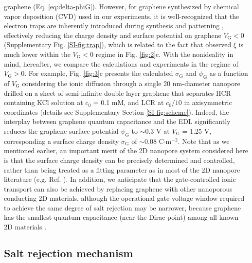\documentclass[journal=nalefd,email=true, hyperref=true, keywords=false]{achemso}
\newcommand{\Fig}{Fig.}
\begin{document}
graphene (Eq. \eqref{eq:delta-phiG}). However, for graphene
synthesized by chemical vapor deposition (CVD) used in our
experiments, it is well-recognized that the electron traps are
inherently introduced during synthesis and patterning
\cite{Dean_2010}, effectively reducing the charge density and surface
potential on graphene $V_{\mathrm{G}}<0$ (Supplementary \Fig{}
\ref{SI-fig:trap}), which is related to the fact that observed $\xi$
is much lower within the $V_{\mathrm{G}}<0$ regime in \Fig{}
\ref{fig:2}c. With the nonideality in mind, hereafter, we compare the
calculations and experiments in the regime of $V_{\mathrm{G}}>0$. For
example, \Fig{} \ref{fig:3}c presents the calculated
$\sigma_{\mathrm{G}}$ and $\psi_{\mathrm{G}}$ as a function of
$V_{\mathrm{G}}$ considering the ionic diffusion through a single 20
nm-diameter nanopore drilled on a sheet of semi-infinite double layer
graphene that separates HCR containing KCl solution at $c_{0}$ = 0.1
mM, and LCR at $c_{0}/10$ in axisymmetric coordinates (details see
Supplementary Section \ref{SI-fig:scheme}). Indeed, the interplay
between graphene quantum capacitance and the EDL significantly reduces
the graphene surface potential $\psi_{\mathrm{G}}$ to $\sim$0.3 V at
$V_{\mathrm{G}}$ = 1.25 V, corresponding a surface charge density
$\sigma_{\mathrm{G}}$ of $\sim$0.08 C$\cdot$m$^{-2}$. Note that as we
mentioned earlier, an important merit of the 2D nanopore system
considered here is that the surface charge density can be precisely
determined and controlled, rather than being treated as a fitting
parameter as in most of the 2D nanopore literature
(e.g. Ref. ). In addition, we anticipate that
the gate-controlled ionic transport can also be achieved by replacing
graphene with other nanoporous conducting 2D materials, although the
operational gate voltage window required to achieve the same degree of
salt rejection may be narrower, because graphene has the smallest
quantum capacitance (near the Dirac point) among all known 2D
materials \cite{Tian_2016}.

\subsection{Salt rejection mechanism}
\label{sec:mechanism}
\end{document}
